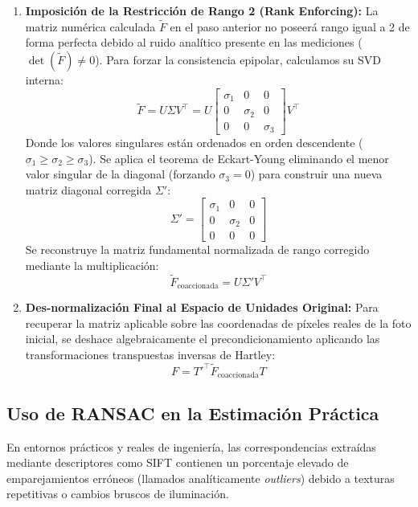 \begin{enumerate}
    \item \textbf{Imposición de la Restricción de Rango 2 (Rank Enforcing):} La matriz numérica calculada $\tilde{F}$ en el paso anterior no poseerá rango igual a 2 de forma perfecta debido al ruido analítico presente en las mediciones ($\det(\tilde{F}) \neq 0$). Para forzar la consistencia epipolar, calculamos su SVD interna:
    \begin{equation*}
        \tilde{F} = U \Sigma V^{\top} = U \begin{bmatrix} \sigma_1 & 0 & 0 \\ 0 & \sigma_2 & 0 \\ 0 & 0 & \sigma_3 \end{bmatrix} V^{\top}
    \end{equation*}
    Donde los valores singulares están ordenados en orden descendente ($\sigma_1 \ge \sigma_2 \ge \sigma_3$). Se aplica el teorema de Eckart-Young eliminando el menor valor singular de la diagonal (forzando $\sigma_3 = 0$) para construir una nueva matriz diagonal corregida $\Sigma'$:
    \begin{equation*}
        \Sigma' = \begin{bmatrix} \sigma_1 & 0 & 0 \\ 0 & \sigma_2 & 0 \\ 0 & 0 & 0 \end{bmatrix} 
    \end{equation*}
    Se reconstruye la matriz fundamental normalizada de rango corregido mediante la multiplicación:
    \begin{equation*}
        \tilde{F}_{\text{coaccionada}} = U \Sigma' V^{\top}
    \end{equation*}
    
    \item \textbf{Des-normalización Final al Espacio de Unidades Original:} Para recuperar la matriz aplicable sobre las coordenadas de píxeles reales de la foto inicial, se deshace algebraicamente el precondicionamiento aplicando las transformaciones transpuestas inversas de Hartley:
    \begin{equation*}
        \boxed{F = T'^{\top} \tilde{F}_{\text{coaccionada}} T}
    \end{equation*}
\end{enumerate}

\subsection{Uso de RANSAC en la Estimación Práctica}
\noindent
En entornos prácticos y reales de ingeniería, las correspondencias extraídas mediante descriptores como SIFT contienen un porcentaje elevado de emparejamientos erróneos (llamados analíticamente \textit{outliers}) debido a texturas repetitivas o cambios bruscos de iluminación. \\ 

